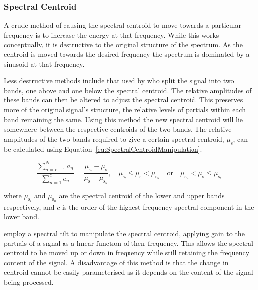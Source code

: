 		\subsubsection*{Spectral Centroid}
			A crude method of causing the spectral centroid to move towards a particular frequency is to
			increase the energy at that frequency. While this works conceptually, it is destructive to the
			original structure of the spectrum. As the centroid is moved towards the desired frequency the
			spectrum is dominated by a sinusoid at that frequency.

			Less destructive methods include that used by \citet{zacharakis2011an} who split the signal into
			two bands, one above and one below the spectral centroid. The relative amplitudes of these bands
			can then be altered to adjust the spectral centroid. This preserves more of the original signal's
			structure, the relative levels of partials within each band remaining the same. Using this method
			the new spectral centroid will lie somewhere between the respective centroids of the two bands. The
			relative amplitudes of the two bands required to give a certain spectral centroid,
			$\mu_{\mathrm{s}}$, can be calculated using Equation~\ref{eq:SpectralCentroidManipulation}.

			\begin{equation}
				\frac{\sum_{n = c + 1}^{N} a_{n}}
				     {{\sum_{n = 1}^{c} a_{n}}} = 
				\frac{\mu_{\mathrm{s}_{l}} - \mu_{\mathrm{s}}}{\mu_{\mathrm{s}} - \mu_{\mathrm{s}_{u}}}, 
				\quad \mu_{\mathrm{s}_{l}} \leq \mu_{\mathrm{s}} < \mu_{\mathrm{s}_{u}} \quad \text{or} 
					\quad \mu_{\mathrm{s}_{u}} < \mu_{\mathrm{s}} \leq \mu_{\mathrm{s}_{l}}
				\label{eq:SpectralCentroidManipulation}
			\end{equation}

			where $\mu_{\mathrm{s}_{l}}$ and $\mu_{\mathrm{s}_{u}}$ are the spectral centroid of the lower and
			upper bands respectively, and $c$ is the order of the highest frequency spectral component in the
			lower band.

			\citet{williams2007perceptually} employ a spectral tilt to manipulate the spectral centroid,
			applying gain to the partials of a signal as a linear function of their frequency. This allows the
			spectral centroid to be moved up or down in frequency while still retaining the frequency content
			of the signal. A disadvantage of this method is that the change in centroid cannot be easily
			parameterised as it depends on the content of the signal being processed.

